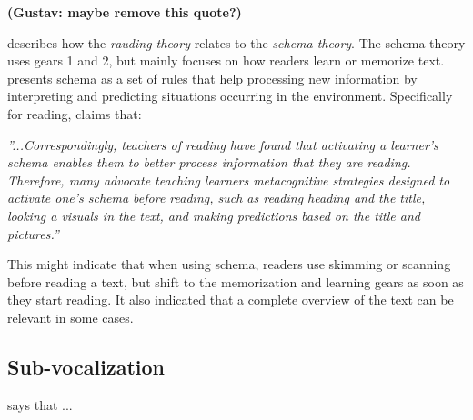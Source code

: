 \textbf{(Gustav: maybe remove this quote?)}

\citeauthor{carver_reading_1992} describes how the \textit{rauding theory} relates to the \textit{schema theory}. The schema theory uses gears 1 and 2, but mainly focuses on how readers learn or memorize text.  presents schema as a set of rules that help processing new information by interpreting and predicting situations occurring in the environment. Specifically for reading, \citeauthor{widmayer_schema_2005} claims that:

 \emph{''...Correspondingly, teachers of reading have found that activating a learner's schema enables them to better process information that they are reading. Therefore, many advocate teaching learners metacognitive strategies designed to activate one's schema before reading, such as reading heading and the title, looking a visuals in the text, and making predictions based on the title and pictures.''}

This might indicate that when using schema, readers use skimming or scanning before reading a text, but shift to the memorization and learning gears as soon as they start reading. It also indicated that a complete overview of the text can be relevant in some cases.


\subsection{Sub-vocalization}
 says that ...
